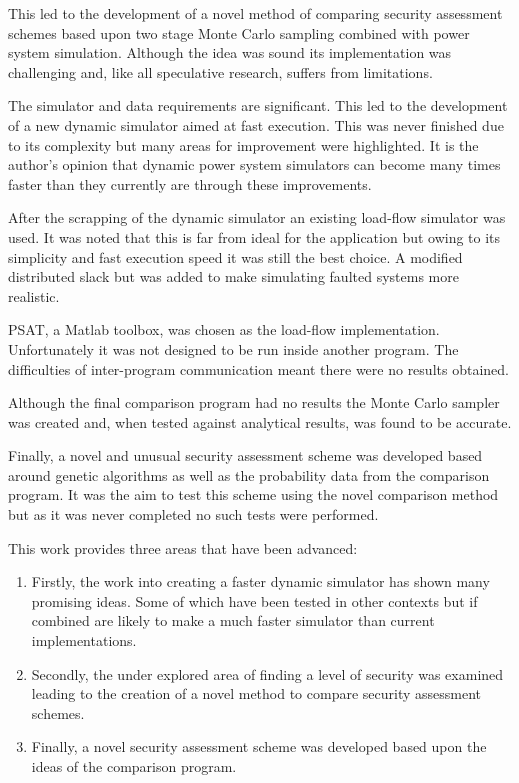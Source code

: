 \documentclass[a4paper,oneside,12pt]{report}
\begin{document}
This led to the development of a novel method of comparing security assessment schemes based upon two stage Monte Carlo sampling combined with power system simulation. Although the idea was sound its implementation was challenging and, like all speculative research, suffers from limitations.

The simulator and data requirements are significant. This led to the development of a new dynamic simulator aimed at fast execution. This was never finished due to its complexity but many areas for improvement were highlighted. It is the author's opinion that dynamic power system simulators can become many times faster than they currently are through these improvements.

After the scrapping of the dynamic simulator an existing load-flow simulator was used. It was noted that this is far from ideal for the application but owing to its simplicity and fast execution speed it was still the best choice. A modified distributed slack but was added to make simulating faulted systems more realistic.

PSAT, a Matlab toolbox, was chosen as the load-flow implementation. Unfortunately it was not designed to be run inside another program. The difficulties of inter-program communication meant there were no results obtained.

Although the final comparison program had no results the Monte Carlo sampler was created and, when tested against analytical results, was found to be accurate.

Finally, a novel and unusual security assessment scheme was developed based around genetic algorithms as well as the probability data from the comparison program. It was the aim to test this scheme using the novel comparison method but as it was never completed no such tests were performed.

This work provides three areas that have been advanced:

\begin{enumerate}
\item Firstly, the work into creating a faster dynamic simulator has shown many promising ideas. Some of which have been tested in other contexts but if combined are likely to make a much faster simulator than current implementations.
\item Secondly, the under explored area of finding a level of security was examined leading to the creation of a novel method to compare security assessment schemes.
\item Finally, a novel security assessment scheme was developed based upon the ideas of the comparison program.
\end{enumerate}
\end{document}
